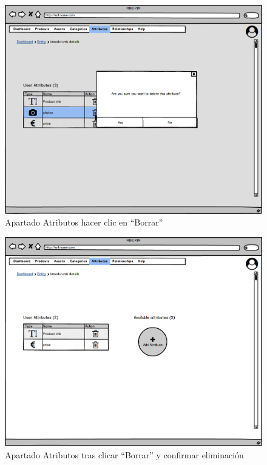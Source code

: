 \begin{figure}[H]
    \includegraphics[width=1\linewidth]{mockups/RF6.4BorrarAtributo.png}
    \caption{Apartado Atributos hacer clic en \enquote{Borrar}}
   \end{figure}
\vspace{1.0cm}

\begin{figure}[H]
    \includegraphics[width=1\linewidth]{mockups/RF6.4BorrarAtributoDespuesDeBorrar.png}
    \caption{Apartado Atributos tras clicar \enquote{Borrar} y confirmar eliminación}
   \end{figure}
\vspace{1.0cm}




\newpage %